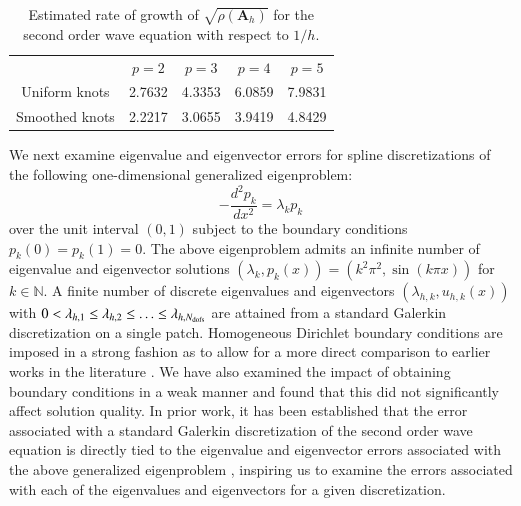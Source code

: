 \documentclass[preprint,10pt]{elsarticle}
\newcommand{\LRp}[1]{\left( #1 \right)}
\newcommand{\reviewerTwo}[1]{#1}
\begin{document}
\begin{table}[!h]
\centering
\begin{tabular}{|c||c|c|c|c|}
\hline
& $p = 2$ & $p = 3$ & $p=4$ & $p=5$\\
\hhline{|=|=|=|=|=|}
Uniform knots & 2.7632  &  4.3353  &  6.0859  &  7.9831\\
\hline
Smoothed knots & 2.2217     &3.0655     & 3.9419    &4.8429\\
\hline
\end{tabular}
\caption{Estimated rate of growth of $\sqrt{\rho\LRp{\bm{A}_h}}$ for the second order wave equation with respect to $1/h$.}
\label{table:rhoA2}
\end{table}

% 

\reviewerTwo{We next examine eigenvalue and eigenvector errors for spline discretizations of the following one-dimensional generalized eigenproblem:
\[
-\frac{d^2p_k}{dx^2} = \lambda_k p_k
\]
over the unit interval $(0,1)$ subject to the boundary conditions $p_k(0) = p_k(1) = 0$.  The above eigenproblem admits an infinite number of eigenvalue and eigenvector solutions $\left(\lambda_k,p_k(x) \right) = \left(k^2\pi^2, \sin(k\pi x) \right)$ for $k \in \mathbb{N}$.  A finite number of discrete eigenvalues and eigenvectors $\left(\lambda_{h,k}, u_{h,k}(x)\right)$ with $0 < \lambda_{h,1} \leq \lambda_{h,2} \leq \ldots \leq \lambda_{h,N_{\rm dofs}}$ are attained from a standard Galerkin discretization on a single patch.  Homogeneous Dirichlet boundary conditions are imposed in a strong fashion as to allow for a more direct comparison to earlier works in the literature \cite{hughes2008duality, hughes2014finite}.  We have also examined the impact of obtaining boundary conditions in a weak manner and found that this did not significantly affect solution quality.  In prior work, it has been established that the error associated with a standard Galerkin discretization of the second order wave equation is directly tied to the eigenvalue and eigenvector errors associated with the above generalized eigenproblem \cite{hughes2014finite}, inspiring us to examine the errors associated with each of the eigenvalues and eigenvectors for a given discretization.}


\end{document}
